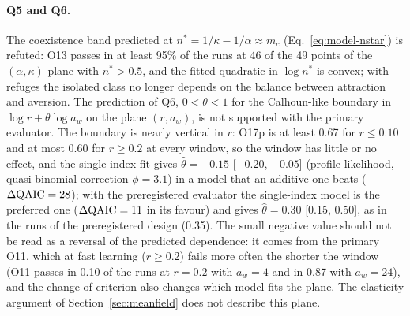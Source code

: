 \paragraph{Q5 and Q6.}
The coexistence band predicted at $n^*=1/\kappa-1/\alpha\approx m_c$ (Eq.~\eqref{eq:model-nstar}) is refuted:
O13 passes in at least 95\% of the runs at 46 of the 49 points of the $(\alpha,\kappa)$ plane with $n^*>0.5$, and
the fitted quadratic in $\log n^*$ is convex; with refuges the isolated class no longer depends on the balance
between attraction and aversion. The prediction of Q6, $0<\theta<1$ for the Calhoun-like boundary in
$\log r+\theta\log a_w$ on the plane $(r,a_w)$, is not supported with the primary evaluator. The boundary is nearly
vertical in $r$: O17p is at least 0.67 for $r\le0.10$ and at most 0.60 for $r\ge0.2$ at every window, so the window
has little or no effect, and the single-index fit gives $\hat\theta=-0.15$ [$-0.20$, $-0.05$] (profile likelihood,
quasi-binomial correction $\phi=3.1$) in a model that an additive one beats ($\Delta{\rm QAIC}=28$); with the
preregistered evaluator the single-index model is the preferred one ($\Delta{\rm QAIC}=11$ in its favour) and gives
$\hat\theta=0.30$ [0.15, 0.50], as in the runs of the preregistered design (0.35). The small negative value should not be read as a reversal of
the predicted dependence: it comes from the primary O11, which at fast learning ($r\ge0.2$) fails more often the
shorter the window (O11 passes in 0.10 of the runs at $r=0.2$ with $a_w=4$ and in 0.87 with $a_w=24$), and the
change of criterion also changes which model fits the plane. The elasticity argument of
Section~\ref{sec:meanfield} does not describe this plane.

